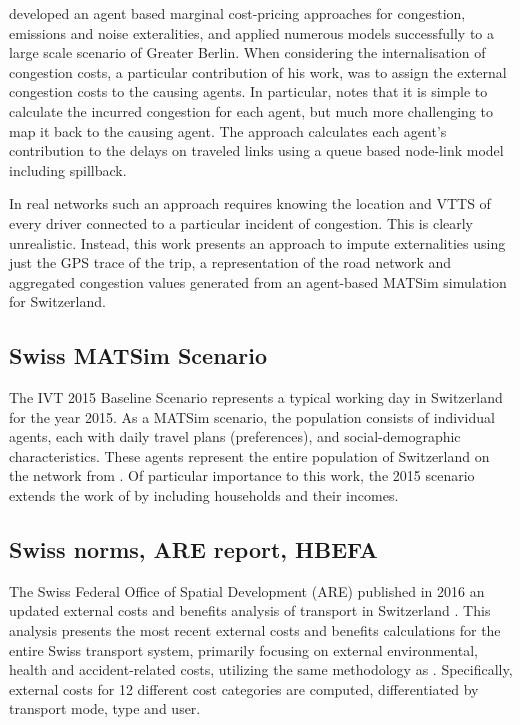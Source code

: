 \citet{kaddoura2015marginal} developed an agent based marginal cost-pricing approaches for congestion, emissions and noise exteralities, and applied numerous models successfully to a large scale scenario of Greater Berlin.
When considering the internalisation of congestion costs, a particular contribution of his work, was to assign the external congestion costs to the causing agents.
In particular, \citet{kaddoura2015marginal} notes that it is simple to calculate the incurred congestion for each agent, but much more challenging to map it back to the causing agent.
The approach calculates each agent's contribution to the delays on traveled links using a queue based node-link model including spillback.

In real networks such an approach requires knowing the location and VTTS of every driver connected to a particular incident of congestion.
This is clearly unrealistic. Instead, this work presents an approach to impute externalities using just the GPS trace of the trip, a representation of the road network and aggregated congestion values generated from an agent-based MATSim simulation for Switzerland.

\subsection{Swiss MATSim Scenario}
The IVT 2015 Baseline Scenario \cite{boesch2015ivt} represents a typical working day in Switzerland for the year 2015.
As a MATSim scenario, the population consists of individual agents, each with daily travel plans (preferences), and social-demographic characteristics.
These agents represent the entire population of Switzerland on the network from \cite{boesch2015network}.
Of particular importance to this work, the 2015 scenario extends the work of \cite{Balmer2007switzerland} by including households and their incomes. 

\subsection{Swiss norms, ARE report, HBEFA}
The Swiss Federal Office of Spatial Development (ARE) published in 2016 an updated external costs and benefits analysis of transport in Switzerland \cite{are2016externalcosts}.
This analysis presents the most recent external costs and benefits calculations for the entire Swiss transport system, primarily focusing on external environmental, health and accident-related costs, utilizing the same methodology as \cite{ecoplaninfras2014externeeffekte}.
Specifically, external costs for 12 different cost categories are computed, differentiated by transport mode, type and user. 

